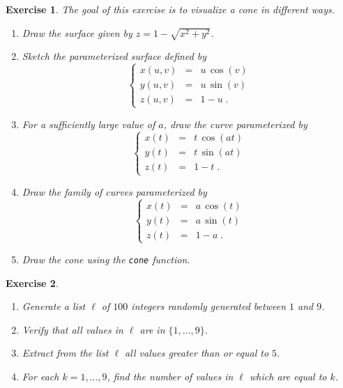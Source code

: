 \documentclass{article}
\newtheorem{exo}{Exercise}[section]
\begin{document}
\begin{exo}{\rm
The goal of this exercise is to visualize a cone in different ways.
\begin{enumerate}
\item
Draw the surface given by $z=1-\sqrt{x^2+y^2}$.
\item
Sketch the parameterized surface defined by
\[
\left\{
\begin{array}{lcl}
x(u,v)&=& u\,\cos(v)\\
y(u,v)&=& u\,\sin(v)\\
z(u,v)&=& 1-u\;.
\end{array}
\right.
\]
\item
For a sufficiently large value of $a$, draw the curve parameterized by
\[
\left\{
\begin{array}{lcl}
x(t)&=& t\,\cos(a t)\\
y(t)&=& t\,\sin(a t)\\
z(t)&=& 1-t\;.
\end{array}
\right.
\]

\item
Draw the family of curves parameterized by
\[
\left\{
\begin{array}{lcl}
x(t)&=& a\,\cos(t)\\
y(t)&=& a\,\sin(t)\\
z(t)&=& 1-a\;.
\end{array}
\right.
\]
\item 
Draw the cone using the \texttt{cone} function.
\end{enumerate} 
}\end{exo}
\begin{exo}{\rm ~
\begin{enumerate}
\item
Generate a list $\ell$ of $100$ integers randomly generated between $1$ and $9$.
\item
Verify that all values in $\ell$ are in $\{1,\ldots,9\}$.
\item
Extract from the list $\ell$ all values greater than or equal to $5$.
\item
For each $k=1,\ldots,9$, find the number of values in $\ell$ which are
equal to $k$.
\end{enumerate} 
}\end{exo}
\end{document}

